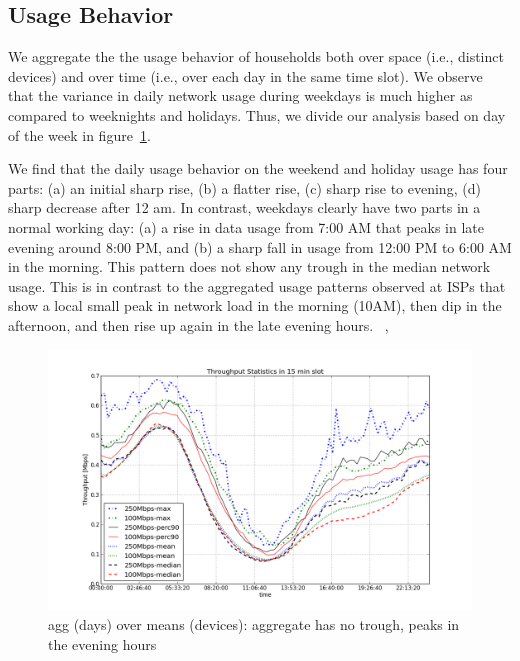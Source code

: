\subsection{Usage Behavior}
\label{subsec:behavior}

We aggregate the the usage behavior of households both over space (i.e., distinct devices)
and over time (i.e., over each day in the same time slot). We observe that the variance in
daily network usage during weekdays is much higher as compared to weeknights and holidays.
Thus, we divide our analysis based on day of the week in figure~\ref{fig:TS-data-rate-daily}. 

We find that the daily usage behavior on the weekend and holiday usage has four parts:
(a) an initial sharp rise, (b) a flatter rise, (c) sharp rise to evening, (d) sharp decrease
after 12 am. In contrast, weekdays clearly have two parts in a normal working day: (a) a rise
in data usage from 7:00 AM that peaks in late evening around 8:00 PM, and (b) a sharp fall in
usage from 12:00 PM to 6:00 AM in the morning. This pattern does not show any trough in the
median network usage. This is in contrast to the aggregated usage patterns observed at ISPs
that show a local small peak in network load in the morning (10AM), then dip in the afternoon,
and then rise up again in the late evening hours. ~\cite{sandvine2014report1},

\begin{figure}[ht!]
\begin{minipage}{\linewidth}
  \centering
  \includegraphics[width=\linewidth]{figures/describe-total-throughput-per-day[replace].png}
  \caption{agg (days) over means (devices): aggregate has no trough, peaks in the evening hours}
  \label{fig:TS-data-rate-daily}
\end{minipage}
\end{figure}

